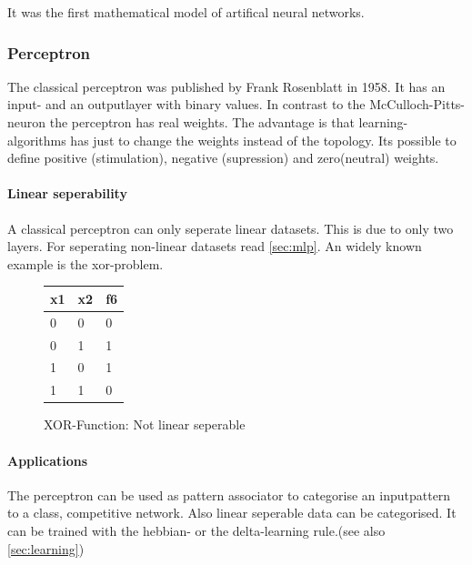 \documentclass[10pt,a4paper,DIV=11]{scrreprt}
\begin{document}
It was the first mathematical model of artifical neural networks.\cite{NEURONMATH}


\subsubsection{Perceptron}
The classical perceptron was published by Frank Rosenblatt in 1958.
It has an input- and an outputlayer with binary values. In contrast to the McCulloch-Pitts-neuron
the perceptron has real weights. The advantage is that learning-algorithms has just to change the weights
instead of the topology. Its possible to define positive (stimulation), negative (supression) and zero(neutral) weights.

\paragraph{Linear seperability}
A classical perceptron can only seperate linear datasets. This is due to only two layers. For seperating non-linear datasets read \ref{sec:mlp}.
An widely known example is the xor-problem.

\begin{figure}[H]
	\centering
\begin{tabular}{|l|l|l|}
	\hline
	x1 & x2 & f6\\
	\hline
	0 & 0 & 0 \\
	\hline
	0 & 1 & 1 \\
	\hline
	1 & 0 & 1 \\
	\hline
	1 & 1 & 0 \\
	\hline
\end{tabular}
	\caption{XOR-Function: Not linear seperable}
	\label{fig:linsep1}
	
		
\end{figure}

\paragraph{Applications}
The perceptron can be used as pattern associator to categorise an inputpattern to a class, competitive network. Also linear seperable data can be categorised.
It can be trained with the hebbian- or the delta-learning rule.(see also \eqref{sec:learning})
\end{document}
